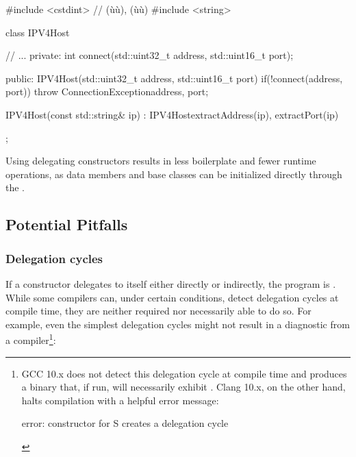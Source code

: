 \begin{emcppslisting}[language=C++]
#include <cstdint> // (ù{}ù), (ù{}ù)
#include <string>

class IPV4Host
{
     // ...
private:
    int connect(std::uint32_t address, std::uint16_t port);

public:
    IPV4Host(std::uint32_t address, std::uint16_t port)
    {
        if(!connect(address, port))
        {
            throw ConnectionException{address, port};
        }
    }

    IPV4Host(const std::string& ip)
        : IPV4Host{extractAddress(ip), extractPort(ip)}
    {
    }
};
\end{emcppslisting}

\noindent Using delegating constructors results in less boilerplate and fewer runtime
operations, as data members and base classes can be initialized
directly through the .

\subsection[Potential Pitfalls]{Potential Pitfalls}\label{ctordelegrating-potential-pitfalls}

\subsubsection[Delegation cycles]{Delegation cycles}\label{delegation-cycles}

If a constructor delegates to itself either directly or indirectly, the
program is . While some compilers can, under certain conditions, detect delegation cycles at compile time, they are neither
required nor necessarily able to do so. For example, even the simplest delegation cycles might not result in a diagnostic from a compiler{\cprotect\footnote{GCC 10.x does not detect this delegation
cycle at compile time and produces a binary that, if run, will
necessarily exhibit . Clang 10.x, on the
other hand, halts compilation with a helpful error message:

\begin{emcppslisting}[style=plain, basicstyle={\ttfamily\footnotesize}]
error: constructor for S creates a delegation cycle
\end{emcppslisting}\vspace*{-1ex}
      }}:


